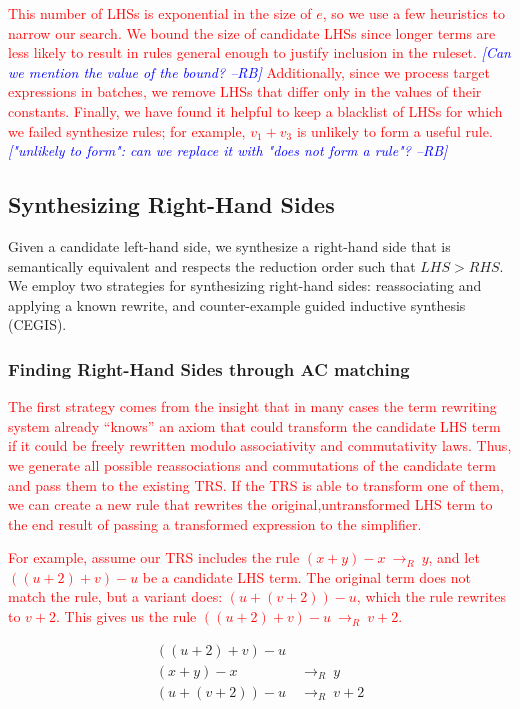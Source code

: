 \documentclass[acmsmall,review]{acmart}\settopmatter{printfolios=true,printccs=false,printacmref=false}
\newcommand{\rb}[1]{\textcolor{blue}{\textit{[{#1} --RB]}}}
\newcommand{\modified}[1]{\textcolor{red}{{#1}}}
\newcommand{\rewrites}[0]{\:\rightarrow_{R}\:}
\begin{document}
\modified{This number of LHSs is exponential in the size of $e$, so we use a few heuristics to narrow 
our search. We bound the size of candidate LHSs since longer terms are less likely to 
result in rules general enough to justify inclusion in the ruleset. 
\rb{Can we mention the value of the bound?}
Additionally, since we process target expressions in batches, we remove 
LHSs that differ only in the values of their constants. 
Finally, we have found it helpful to keep a blacklist of LHSs for which we failed synthesize rules; for example, $v_1 + v_3$ is unlikely to form a useful rule.}
\rb{"unlikely to form": can we replace it with "does not form a rule"?   }

\subsection{Synthesizing Right-Hand Sides} Given a candidate left-hand side, we 
synthesize a right-hand side that is semantically equivalent and
respects the reduction order such that $\mathit{LHS} > \mathit{RHS}$.
We employ two strategies for synthesizing right-hand sides:
reassociating and applying a known rewrite, and counter-example guided
inductive synthesis (CEGIS).

\subsubsection{Finding Right-Hand Sides through AC matching}
\label{sec:rhsacmatching}
\modified{The first strategy comes from the insight that in many cases the term rewriting system 
already ``knows'' an axiom that could transform the candidate LHS term if it could be freely 
rewritten modulo associativity and commutativity laws. Thus, we generate all possible 
reassociations and commutations of the candidate term and pass them to the existing TRS. 
If the TRS is able to transform one of them, we can create a new rule that rewrites 
the original,untransformed LHS term to the end result of passing a transformed expression to the simplifier.}

\modified{For example, assume our TRS includes the rule $(x + y) - x \rewrites y$, 
and let $((u + 2) + v) - u$ be a candidate LHS term. The original term does not match
the rule, but a variant does: $(u + (v + 2)) - u$, which the rule 
rewrites to $v + 2$. This gives us the rule $((u + 2) + v) - u \rewrites v + 2$. }

\begin{equation*}
\begin{split}
\boxed{((u + 2) + v) - u} &  \\
(x + y) - x & \rewrites  y \\
(u + (v + 2)) - u & \rewrites  \boxed{v + 2} \\
\end{split}
\end{equation*}
\end{document}
